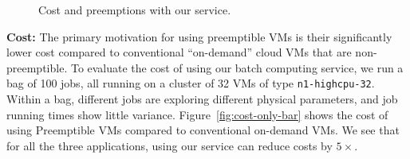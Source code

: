 





\begin{figure}[t]
  \centering
\hfill
{}
\label{fig:service-all}
\caption{Cost and preemptions with our service.}
\end{figure}  



\noindent \textbf{Cost:}
The primary motivation for using preemptible VMs is their significantly lower cost compared to conventional ``on-demand'' cloud VMs that are non-preemptible.
To evaluate the cost of using our batch computing service, we run a bag of 100 jobs, all running on a cluster of 32 VMs of type \texttt{n1-highcpu-32}. 
Within a bag, different jobs are exploring different physical parameters, and job running times show little variance. 
Figure~\ref{fig:cost-only-bar} shows the cost of using Preemptible VMs compared to conventional on-demand VMs.
We see that for all the three applications, using our service can reduce costs by $5\times$.

